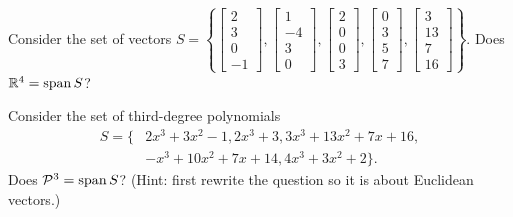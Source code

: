 \begin{applicationActivities}
\begin{activity}{5}
  Consider the set of vectors \(S=\left\{
  \begin{bmatrix}2\\3\\0\\-1\end{bmatrix},
  \begin{bmatrix}1\\-4\\3\\0\end{bmatrix},
  \begin{bmatrix}2\\0\\0\\3\end{bmatrix},
  \begin{bmatrix}0\\3\\5\\7\end{bmatrix},
  \begin{bmatrix}3\\13\\7\\16\end{bmatrix}
  \right\}
  \).
  Does
  \(\mathbb{R}^4=\operatorname{span} S\)?
\end{activity}

\begin{activity}{10}
  Consider the set of third-degree polynomials 
  \begin{align*}
  S=\{
  &2x^3+3x^2-1,
  2x^3+3,
  3x^3+13x^2+7x+16, \\
  &-x^3+10x^2+7x+14,
  4x^3+3x^2+2 \} .
  \end{align*}
  Does
  \(\mathcal{P}^3=\operatorname{span} S\)?
  (Hint: first rewrite the question so it is about Euclidean vectors.)
\end{activity}


\end{applicationActivities}

